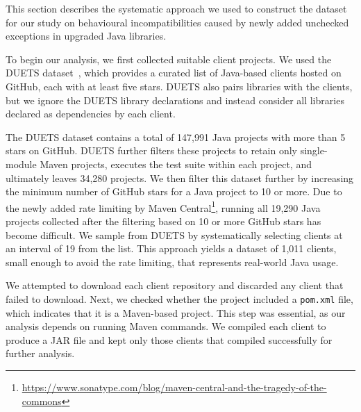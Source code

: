 This section describes the systematic approach we used to construct the dataset for our study on behavioural incompatibilities caused by newly added unchecked exceptions in upgraded Java libraries. 

To begin our analysis, we first collected suitable client projects. We used the DUETS dataset~\cite{durieux21:_duets}, which provides a curated list of Java-based clients hosted on GitHub, each with at least five stars. DUETS also pairs libraries with the clients, but we ignore the DUETS library declarations and instead consider all libraries declared as dependencies by each client.

The DUETS dataset contains a total of 147,991 Java projects with more than 5 stars on GitHub. DUETS further filters these projects to retain only single-module Maven projects, executes the test suite within each project, and ultimately leaves 34,280 projects. We then filter this dataset further by increasing the minimum number of GitHub stars for a Java project to 10 or more. Due to the newly added rate limiting by Maven Central\footnote{\tiny \url{https://www.sonatype.com/blog/maven-central-and-the-tragedy-of-the-commons}}, running all 19,290 Java projects collected after the filtering based on 10 or more GitHub stars has become difficult. We sample from DUETS by systematically selecting clients at an interval of 19 from the list. This approach yields a dataset of 1,011 clients, small enough to avoid the rate limiting, that represents real-world Java usage.

We attempted to download each client repository and discarded any client that failed to download.
Next, we checked whether the project included a \texttt{pom.xml} file, which indicates that it is a Maven-based project. This step was essential, as our analysis depends on running Maven commands. We compiled each client to produce a JAR file and kept only those clients that compiled successfully for further analysis.
